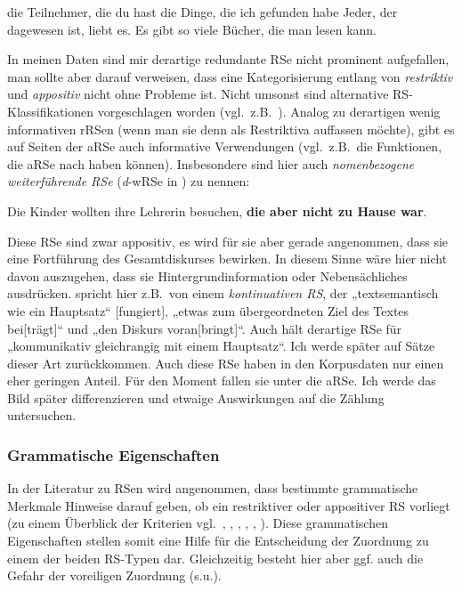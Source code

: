 \begin{exe}
	\ex\label{729} 
		\begin{xlist}	
			\ex\label{729a} die Teilnehmer, die du hast
			\ex\label{729b} die Dinge, die ich gefunden habe
			\ex\label{729c} Jeder, der dagewesen ist, liebt es.
			\ex\label{729d} Es gibt so viele Bücher, die man lesen kann.
		\end{xlist}
\end{exe}	
In meinen Daten sind mir derartige redundante RSe nicht prominent aufgefallen, man sollte aber darauf verweisen, dass eine Kategorisierung entlang von \textit{restriktiv} und \textit{appositiv} nicht ohne Probleme ist. Nicht umsonst sind alternative RS-Klassifikationen vorgeschlagen worden (vgl.\ z.B.\ \citealt[301--302]{Fox1990}). Analog zu derartigen wenig informativen rRSen (wenn man sie denn als Restriktiva auffassen möchte), gibt es auf Seiten der aRSe auch informative Verwendungen (vgl.\ z.B.\ die Funktionen, die aRSe nach \citealt{Loetscher1998} haben können). Insbesondere sind hier auch \textit{nomenbezogene weiterführende RSe} (\textit{d}-wRSe in \citealt{Holler2005}) zu nennen:

\begin{exe}
	\ex\label{730} 
	Die Kinder wollten ihre Lehrerin besuchen, \textbf{die aber nicht zu Hause war}.
	\newline
	\hbox{}\hfill\hbox{\citet[85]{Holler2005}}
\end{exe}
Diese RSe sind zwar appositiv, es wird für sie aber gerade angenommen, dass sie eine Fortführung des Gesamtdiskurses bewirken. In diesem Sinne wäre hier nicht davon auszugehen, dass sie Hintergrundinformation oder Nebensächliches ausdrücken. \citet[272--273]{Lehmann1984} spricht hier z.B.\ von einem \textit{kontinuativen RS}, der „textsemantisch wie ein Hauptsatz“ [fungiert], „etwas zum übergeordneten Ziel des Textes bei[trägt]“  und  „den Dis\-kurs voran[bringt]“. Auch \citet[70]{Brandt1990} hält derartige RSe für  „kommunikativ gleichrangig mit einem Hauptsatz“. Ich werde später auf Sätze dieser Art zurückkommen. Auch diese RSe haben in den Korpusdaten nur einen eher geringen Anteil. Für den Moment fallen sie unter die aRSe. Ich werde das Bild später differenzieren und etwaige Auswirkungen auf die Zählung untersuchen.

\subsubsection{Grammatische Eigenschaften}
In der Literatur zu RSen wird angenommen, dass bestimmte grammatische Merkmale Hinweise darauf geben, ob ein restriktiver oder appositiver RS vorliegt (zu einem Überblick der Kriterien vgl.\ \citealt[182--183]{Schaffranietz1997}, \citealt{Becker1978}, \citealt[25--40]{Holler2005}, \citealt[32--51]{Birkner2008}, \citealt[263--267]{Lehmann1984}, \citealt[62--69]{Zifonun2001}). Diese grammatischen Eigenschaften stellen somit eine Hilfe für die Entscheidung der Zuordnung zu einem der beiden RS-Typen dar. Gleichzeitig besteht hier aber ggf. auch die Gefahr der voreiligen Zuordnung (s.u.).

